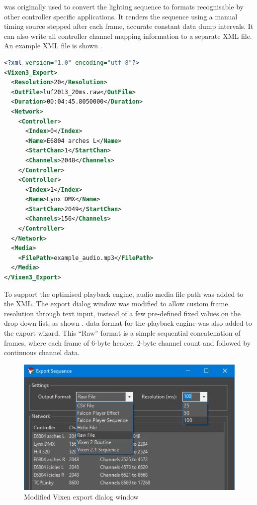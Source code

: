 
 was originally used to convert the lighting sequence to formats recognisable by other controller specific applications. It renders the sequence using a manual timing source stepped after each frame,  accurate constant data dump intervals. It can also write all controller channel mapping information to a separate XML file. An example XML file is shown  .

\begin{lstlisting}[float,floatplacement=ht,language=XML,label=lst:network_xml,captionpos=b,caption={\footnotesize Example controller mapping XML file}]
<?xml version="1.0" encoding="utf-8"?>
<Vixen3_Export>
  <Resolution>20</Resolution>
  <OutFile>luf2013_20ms.raw</OutFile>
  <Duration>00:04:45.8050000</Duration>
  <Network>
    <Controller>
      <Index>0</Index>
      <Name>E6804 arches L</Name>
      <StartChan>1</StartChan>
      <Channels>2048</Channels>
    </Controller>
    <Controller>
      <Index>1</Index>
      <Name>Lynx DMX</Name>
      <StartChan>2049</StartChan>
      <Channels>156</Channels>
    </Controller>
  </Network>
  <Media>
    <FilePath>example_audio.mp3</FilePath>
  </Media>
</Vixen3_Export>
\end{lstlisting}

To support the  optimised playback engine, audio media file path was added to the XML. The export dialog window was modified to allow custom frame resolution through text input, instead of a few pre-defined fixed values on the drop down list, as shown  .  data format  for the playback engine was also added to the export wizard. This ``Raw'' format is a simple sequential concatenation of frames, where each frame  of 6-byte header, 2-byte channel count and  followed by continuous channel data.

\begin{figure}[t]
  \centering
  \includegraphics[width=0.75\columnwidth]{Figs/vixen_export.png}
  \caption{\footnotesize Modified Vixen export dialog window}
  \label{fig:vixen_export}
\end{figure}

